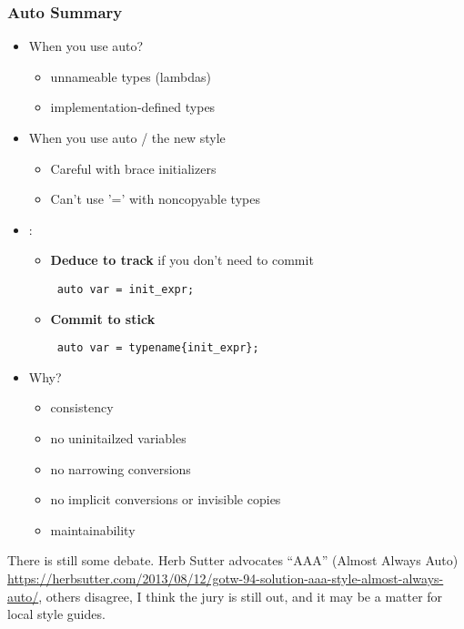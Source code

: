 \begin{frame}[fragile]
\frametitle{Auto Summary}
\begin{itemize}[<+->]
\item When  you use auto?
  \begin{itemize}
  \item unnameable types (lambdas)
  \item implementation-defined types
  \end{itemize}
\item When  you use auto / the new style
  \begin{itemize}
  \item Careful with brace initializers
  \item Can't use '=' with noncopyable types
  \end{itemize}
\item {}:
  \begin{itemize}
  \item {\bf Deduce to track} if you don't need to commit
{\scriptsize \begin{verbatim} auto var = init_expr; \end{verbatim} }
  \item {\bf Commit to stick}
{\scriptsize \begin{verbatim} auto var = typename{init_expr}; \end{verbatim} }
  \end{itemize}
\item Why?
  \begin{itemize}
  \item consistency
  \item no uninitailzed variables
  \item no narrowing conversions
  \item no implicit conversions or invisible copies
  \item maintainability
  \end{itemize}
\end{itemize}
\center{ \textcolor{purple} {Everywhere you can.} }
\center{ \textcolor{purple} {(unless it's trivial?)} }
\center{ \textcolor{purple} {(unless it's confusing?)} }


There is still some debate.  Herb Sutter advocates ``AAA'' (Almost Always Auto)
\url{https://herbsutter.com/2013/08/12/gotw-94-solution-aaa-style-almost-always-auto/}, others
disagree, I think the jury is still out, and it may be a matter for local style guides.


\end{frame}



